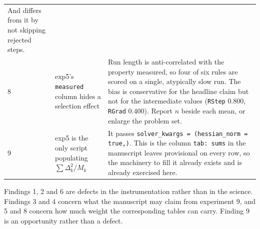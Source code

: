 \documentclass[11pt,a4paper]{article}
\newcommand{\jl}[1]{\texttt{\small #1}}
\begin{document}
\begin{longtable}{@{}p{8mm}p{60mm}p{74mm}@{}}
And differs from it by not skipping rejected steps. \\[3pt]
8 & exp5's \jl{measured} column hides a selection effect &
Run length is anti-correlated with the property measured, so four of six rules are
scored on a single, atypically slow run. The bias is conservative for the headline
claim but not for the intermediate values (\jl{RStep} $0.800$, \jl{RGrad} $0.400$).
Report $n$ beside each mean, or enlarge the problem set. \\[3pt]
9 & exp5 is the only script populating $\sum\Delta_k^2/M_k$ &
It passes \jl{solver\_kwargs = (hessian\_norm = true,)}. This is the column
\jl{tab: sums} in the manuscript leaves provisional on every row, so the machinery
to fill it already exists and is already exercised here. \\
\bottomrule
\end{longtable}

\vspace{4mm}
\noindent\textcolor{Muted}{\small Findings 1, 2 and 6 are defects in the
instrumentation rather than in the science. Findings 3 and 4 concern what the
manuscript may claim from experiment 9, and 5 and 8 concern how much weight the
corresponding tables can carry. Finding 9 is an opportunity rather than a defect.}
\end{document}
